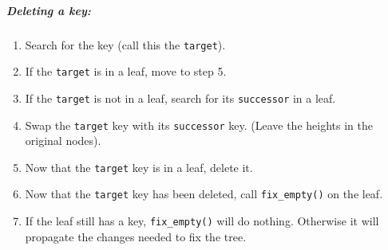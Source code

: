 \documentclass{article}
\newcommand{\code}[1]{\texttt{#1}}
\begin{document}
\subparagraph*{Deleting a key: }
\begin{enumerate}[noitemsep]
    \item Search for the key (call this the \code{target}).
    \item If the \code{target} is in a leaf, move to step 5.
    \item If the \code{target} is not in a leaf, search for its \code{successor} in a leaf.
    \item Swap the \code{target} key with its \code{successor} key. (Leave the heights in the original nodes).
    \item Now that the \code{target} key is in a leaf, delete it.
    \item Now that the \code{target} key has been deleted, call \code{fix\_empty()} on the leaf.
    \item If the leaf still has a key, \code{fix\_empty()} will do nothing. Otherwise it will propagate the changes needed to fix the tree.
\end{enumerate}
\end{document}
